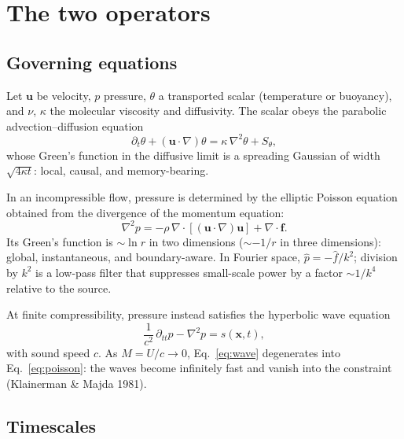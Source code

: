 \documentclass[11pt]{article}
\begin{document}
\section{The two operators}
\label{sec:operators}

\subsection{Governing equations}

Let $\mathbf{u}$ be velocity, $p$ pressure, $\theta$ a transported scalar
(temperature or buoyancy), and $\nu$, $\kappa$ the molecular viscosity and
diffusivity. The scalar obeys the parabolic advection--diffusion equation
\begin{equation}
\partial_t \theta + (\mathbf{u}\cdot\nabla)\theta
= \kappa\,\nabla^2\theta + S_\theta,
\label{eq:scalar}
\end{equation}
whose Green's function in the diffusive limit is a spreading Gaussian of width
$\sqrt{4\kappa t}$: local, causal, and memory-bearing.

In an incompressible flow, pressure is determined by the elliptic Poisson equation
obtained from the divergence of the momentum equation:
\begin{equation}
\nabla^2 p = -\rho\,\nabla\cdot\left[(\mathbf{u}\cdot\nabla)
\mathbf{u}\right] + \nabla\cdot\mathbf{f}.
\label{eq:poisson}
\end{equation}
Its Green's function is $\sim \ln r$ in two dimensions ($\sim -1/r$ in three
dimensions): global, instantaneous, and boundary-aware. In Fourier space,
$\hat{p} = -\hat{f}/k^2$; division by $k^2$ is a low-pass filter that suppresses
small-scale power by a factor $\sim 1/k^4$ relative to the source.

At finite compressibility, pressure instead satisfies the hyperbolic wave equation
\begin{equation}
\frac{1}{c^2}\,\partial_{tt}p - \nabla^2 p = s(\mathbf{x},t),
\label{eq:wave}
\end{equation}
with sound speed $c$. As $M = U/c \to 0$, Eq.~\eqref{eq:wave} degenerates into
Eq.~\eqref{eq:poisson}: the waves become infinitely fast and vanish into the
constraint (Klainerman \& Majda 1981).

\subsection{Timescales}
\end{document}
